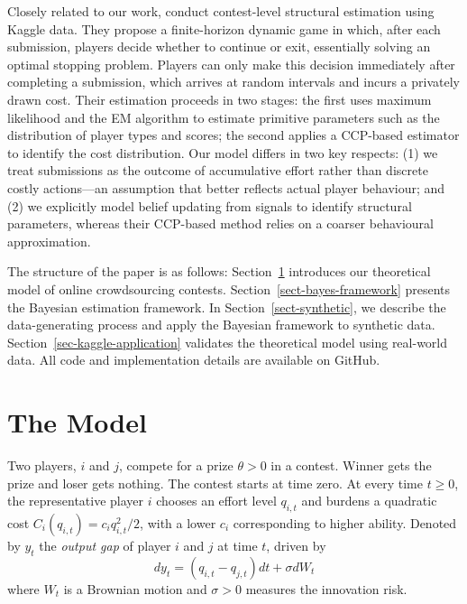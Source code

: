 \documentclass[mnsc]{informs3}
\begin{document}
Closely related to our work, \citet{lemus2021dynamic} conduct contest-level structural estimation using Kaggle data.
They propose a finite-horizon dynamic game in which, after each submission, players decide whether to continue or exit, essentially solving an optimal stopping problem.
Players can only make this decision immediately after completing a submission, which arrives at random intervals and incurs a privately drawn cost.
Their estimation proceeds in two stages: the first uses maximum likelihood and the EM algorithm to estimate primitive parameters such as the distribution of player types and scores; the second applies a CCP-based estimator to identify the cost distribution.
Our model differs in two key respects: 
(1) we treat submissions as the outcome of accumulative effort rather than discrete costly actions—an assumption that better reflects actual player behaviour; and
(2) we explicitly model belief updating from signals to identify structural parameters, whereas their CCP-based method relies on a coarser behavioural approximation.







The structure of the paper is as follows: 
Section~\ref{contest-theory} introduces our theoretical model of online crowdsourcing contests. 
Section~\ref{sect-bayes-framework} presents the Bayesian estimation framework. 
In Section~\ref{sect-synthetic}, we describe the data-generating process and apply the Bayesian framework to synthetic data. 
Section~\ref{sec-kaggle-application} validates the theoretical model using real-world data. 
All code and implementation details are available on GitHub.



\section{The Model}\label{contest-theory}

Two players, $i$ and $j$, compete for a prize $\theta>0$ in a contest. 
Winner gets the prize and loser gets nothing. 
The contest starts at time zero. 
At every time $t\ge0$, the representative player $i$ chooses an effort level $q_{i,t}$ and burdens a quadratic cost $C_i(q_{i,t}) = c_i q_{i,t}^2/2$, with a lower $c_i$ corresponding to higher ability. 
Denoted by $y_t$ the \textit{output gap} of player $i$ and $j$ at time $t$, driven by
\begin{equation}\label{eq-state-dynamics}
	dy_t = (q_{i,t}-q_{j,t})dt + \sigma dW_t
\end{equation}
where $W_t$ is a Brownian motion and $\sigma>0$ measures the innovation risk.
\end{document}
